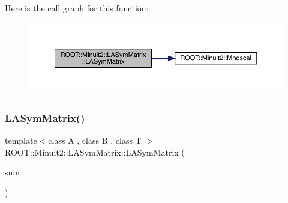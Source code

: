 Here is the call graph for this function\+:
\nopagebreak
\begin{figure}[H]
\begin{center}
\leavevmode
\includegraphics[width=350pt]{d3/d72/classROOT_1_1Minuit2_1_1LASymMatrix_ab44b18a4c1b65cb054c884661843a4a0_cgraph}
\end{center}
\end{figure}
\mbox{\label{classROOT_1_1Minuit2_1_1LASymMatrix_a50f5a1e686ba0b5ac1d296432bdea484}} 
\subsubsection{\texorpdfstring{LASymMatrix()}{LASymMatrix()}\hspace{0.1cm}{\footnotesize\ttfamily [4/30]}}
{\footnotesize\ttfamily template$<$class A , class B , class T $>$ \\
R\+O\+O\+T\+::\+Minuit2\+::\+L\+A\+Sym\+Matrix\+::\+L\+A\+Sym\+Matrix (\begin{DoxyParamCaption}\item[{const \mbox{\hyperlink{classROOT_1_1Minuit2_1_1ABObj}{A\+B\+Obj}}$<$ \mbox{\hyperlink{classROOT_1_1Minuit2_1_1sym}{sym}}, \mbox{\hyperlink{classROOT_1_1Minuit2_1_1ABSum}{A\+B\+Sum}}$<$ \mbox{\hyperlink{classROOT_1_1Minuit2_1_1ABObj}{A\+B\+Obj}}$<$ \mbox{\hyperlink{classROOT_1_1Minuit2_1_1sym}{sym}}, A, T $>$, \mbox{\hyperlink{classROOT_1_1Minuit2_1_1ABObj}{A\+B\+Obj}}$<$ \mbox{\hyperlink{classROOT_1_1Minuit2_1_1sym}{sym}}, B, T $>$ $>$, T $>$ \&}]{sum }\end{DoxyParamCaption})\hspace{0.3cm}{\ttfamily [inline]}}

